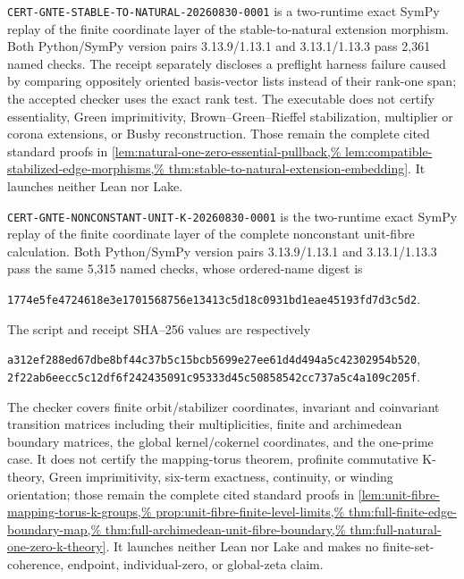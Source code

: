 \texttt{CERT-GNTE-STABLE-TO-NATURAL-20260830-0001} is a two-runtime exact
SymPy replay of the finite coordinate layer of the stable-to-natural extension
morphism.  Both Python/SymPy version pairs 3.13.9/1.13.1 and
3.13.1/1.13.3 pass 2,361 named checks.  The receipt separately discloses a
preflight harness failure caused by comparing oppositely oriented basis-vector
lists instead of their rank-one span; the accepted checker uses the exact
rank test.  The executable does not certify essentiality, Green
imprimitivity, Brown--Green--Rieffel stabilization, multiplier or corona
extensions, or Busby reconstruction.  Those remain the complete cited
standard proofs in
\cref{lem:natural-one-zero-essential-pullback,%
lem:compatible-stabilized-edge-morphisms,%
thm:stable-to-natural-extension-embedding}.  It launches neither Lean nor
Lake.

\texttt{CERT-GNTE-NONCONSTANT-UNIT-K-20260830-0001} is the two-runtime
exact SymPy replay of the finite coordinate layer of the complete
nonconstant unit-fibre calculation.  Both Python/SymPy version pairs
3.13.9/1.13.1 and 3.13.1/1.13.3 pass the same 5,315 named checks, whose
ordered-name digest is
\begin{center}\small
\texttt{1774e5fe4724618e3e1701568756e13413c5d18c0931bd1eae45193fd7d3c5d2}.
\end{center}
The script and receipt SHA--256 values are respectively
\begin{center}\small
\texttt{a312ef288ed67dbe8bf44c37b5c15bcb5699e27ee61d4d494a5c42302954b520},\\
\texttt{2f22ab6eecc5c12df6f242435091c95333d45c50858542cc737a5c4a109c205f}.
\end{center}
The checker covers finite orbit/stabilizer coordinates, invariant and
coinvariant transition matrices including their multiplicities, finite and
archimedean boundary matrices, the global kernel/cokernel coordinates, and
the one-prime case.  It does not certify the mapping-torus theorem,
profinite commutative K-theory, Green imprimitivity, six-term exactness,
continuity, or winding orientation; those remain the complete cited standard
proofs in
\cref{lem:unit-fibre-mapping-torus-k-groups,%
prop:unit-fibre-finite-level-limits,%
thm:full-finite-edge-boundary-map,%
thm:full-archimedean-unit-fibre-boundary,%
thm:full-natural-one-zero-k-theory}.  It launches neither Lean nor Lake and
makes no finite-set-coherence, endpoint, individual-zero, or global-zeta
claim.
